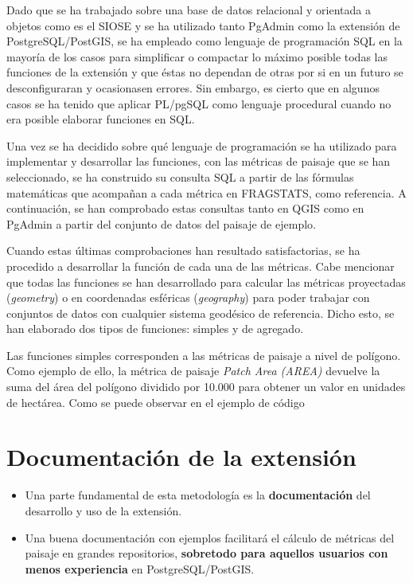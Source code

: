 Dado que se ha trabajado sobre una base de datos relacional y orientada a objetos como es el SIOSE y se ha utilizado tanto PgAdmin como la extensión de PostgreSQL/PostGIS, se ha empleado como lenguaje de programación SQL en la mayoría de los casos para simplificar o compactar lo máximo posible todas las funciones de la extensión y que éstas no dependan de otras por si en un futuro se desconfiguraran y ocasionasen errores. Sin embargo, es cierto que en algunos casos se ha tenido que aplicar PL/pgSQL como lenguaje procedural cuando no era posible elaborar funciones en SQL.

Una vez se ha decidido sobre qué lenguaje de programación se ha utilizado para implementar y desarrollar las funciones, con las métricas de paisaje que se han seleccionado, se ha construido su consulta SQL a partir de las fórmulas matemáticas que acompañan a cada métrica en FRAGSTATS, como referencia. A continuación, se han comprobado estas consultas tanto en QGIS como en PgAdmin a partir del conjunto de datos del paisaje de ejemplo. 

Cuando estas últimas comprobaciones han resultado satisfactorias, se ha procedido a desarrollar la función de cada una de las métricas. Cabe mencionar que todas las funciones se han desarrollado para calcular las métricas proyectadas (\textit{geometry}) o en coordenadas esféricas (\textit{geography}) para poder trabajar con conjuntos de datos con cualquier sistema geodésico de referencia. Dicho esto, se han elaborado dos tipos de funciones: simples y de agregado.

Las funciones simples corresponden a las métricas de paisaje a nivel de polígono. Como ejemplo de ello, la métrica de paisaje \textit{Patch Area (AREA)} devuelve la suma del área del polígono dividido por 10.000 para obtener un valor en unidades de hectárea. Como se puede observar en el ejemplo de código













\section{Documentación de la extensión}

\begin{graybox}
\begin{itemize}
\item Una parte fundamental de esta metodología es la \textbf{documentación} del desarrollo y uso de la extensión. 
\item Una buena documentación con ejemplos facilitará el cálculo de métricas del paisaje en grandes repositorios, \textbf{sobretodo para aquellos usuarios con menos experiencia} en PostgreSQL/PostGIS.
\end{itemize}
\end{graybox}

